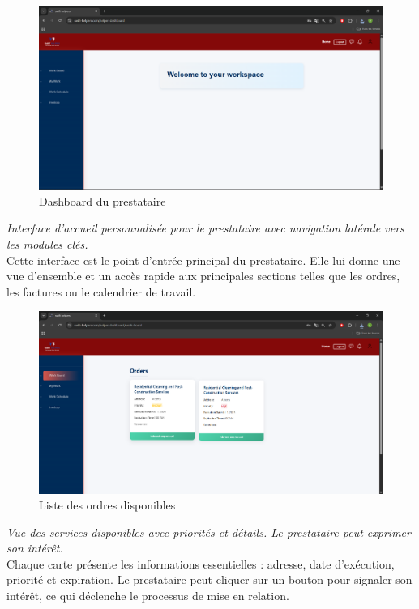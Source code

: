 \begin{figure}[H]
\centering
\includegraphics[width=0.85\linewidth]{figures/helper dashboard.png}
\caption{Dashboard du prestataire}
\end{figure}
\textit{Interface d’accueil personnalisée pour le prestataire avec navigation latérale vers les modules clés.}\\
Cette interface est le point d’entrée principal du prestataire. Elle lui donne une vue d’ensemble et un accès rapide aux principales sections telles que les ordres, les factures ou le calendrier de travail.

\begin{figure}[H]
\centering
\includegraphics[width=0.85\linewidth]{figures/orders.png}
\caption{Liste des ordres disponibles}
\end{figure}
\textit{Vue des services disponibles avec priorités et détails. Le prestataire peut exprimer son intérêt.}\\
Chaque carte présente les informations essentielles : adresse, date d’exécution, priorité et expiration. Le prestataire peut cliquer sur un bouton pour signaler son intérêt, ce qui déclenche le processus de mise en relation.

